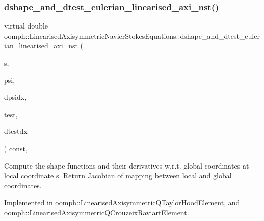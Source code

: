 \subsubsection{\texorpdfstring{dshape\+\_\+and\+\_\+dtest\+\_\+eulerian\+\_\+linearised\+\_\+axi\+\_\+nst()}{dshape\_and\_dtest\_eulerian\_linearised\_axi\_nst()}}
{\footnotesize\ttfamily virtual double oomph\+::\+Linearised\+Axisymmetric\+Navier\+Stokes\+Equations\+::dshape\+\_\+and\+\_\+dtest\+\_\+eulerian\+\_\+linearised\+\_\+axi\+\_\+nst (\begin{DoxyParamCaption}\item[{const \hyperlink{classoomph_1_1Vector}{Vector}$<$ double $>$ \&}]{s,  }\item[{\hyperlink{classoomph_1_1Shape}{Shape} \&}]{psi,  }\item[{\hyperlink{classoomph_1_1DShape}{D\+Shape} \&}]{dpsidx,  }\item[{\hyperlink{classoomph_1_1Shape}{Shape} \&}]{test,  }\item[{\hyperlink{classoomph_1_1DShape}{D\+Shape} \&}]{dtestdx }\end{DoxyParamCaption}) const\hspace{0.3cm}{\ttfamily [protected]}, {}}



Compute the shape functions and their derivatives w.\+r.\+t. global coordinates at local coordinate s. Return Jacobian of mapping between local and global coordinates. 



Implemented in \hyperlink{classoomph_1_1LinearisedAxisymmetricQTaylorHoodElement_ad659c48a698966a356977f6576ad844c}{oomph\+::\+Linearised\+Axisymmetric\+Q\+Taylor\+Hood\+Element}, and \hyperlink{classoomph_1_1LinearisedAxisymmetricQCrouzeixRaviartElement_a8b78103c409fbe8842b7a25510ad15fb}{oomph\+::\+Linearised\+Axisymmetric\+Q\+Crouzeix\+Raviart\+Element}.

\mbox{\label{classoomph_1_1LinearisedAxisymmetricNavierStokesEquations_a645183cd6e617b664cc47d59f3648461}} 
